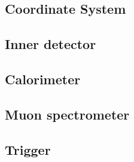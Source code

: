 
\subsection{Coordinate System}
\subsection{Inner detector}
\subsection{Calorimeter}
\subsection{Muon spectrometer}
\subsection{Trigger}
